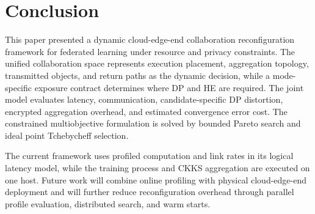\documentclass[5p,times]{elsarticle}
\theoremstyle{plain}
\theoremstyle{definition}
\theoremstyle{remark}
\begin{document}
\FloatBarrier


\section{Conclusion}
\label{sec:conclusion}
This paper presented a dynamic cloud-edge-end collaboration reconfiguration
framework for federated learning under resource and privacy constraints. The
unified collaboration space represents execution placement, aggregation
topology, transmitted objects, and return paths as the dynamic decision, while a
mode-specific exposure contract determines where DP and HE are required. The
joint model evaluates latency, communication, candidate-specific DP distortion,
encrypted aggregation overhead, and estimated convergence error cost. The constrained multiobjective formulation is solved by bounded Pareto
search and ideal point Tchebycheff selection.

The current framework uses profiled computation and link rates in its logical
latency model, while the training process and CKKS aggregation are executed on
one host. Future work will combine online profiling with physical
cloud-edge-end deployment and will further reduce reconfiguration overhead
through parallel profile evaluation, distributed search, and warm starts.

\appendix


\end{document}
